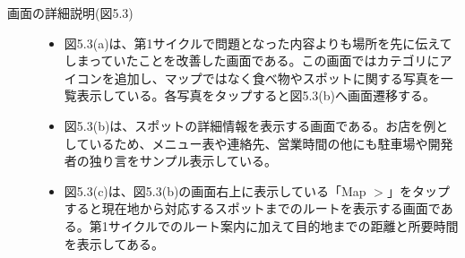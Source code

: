 \begin{description}
\item[画面の詳細説明(図5.3)]\mbox{}
\begin{itemize}
 \item 図5.3(a)は、第1サイクルで問題となった内容よりも場所を先に伝えてしまっていたことを改善した画面である。この画面ではカテゴリにアイコンを追加し、マップではなく食べ物やスポットに関する写真を一覧表示している。各写真をタップすると図5.3(b)へ画面遷移する。
 \item 図5.3(b)は、スポットの詳細情報を表示する画面である。お店を例としているため、メニュー表や連絡先、営業時間の他にも駐車場や開発者の独り言をサンプル表示している。
 \item 図5.3(c)は、図5.3(b)の画面右上に表示している「Map $>$」をタップすると現在地から対応するスポットまでのルートを表示する画面である。第1サイクルでのルート案内に加えて目的地までの距離と所要時間を表示してある。 \newpage

\end{itemize}
\end{description}

